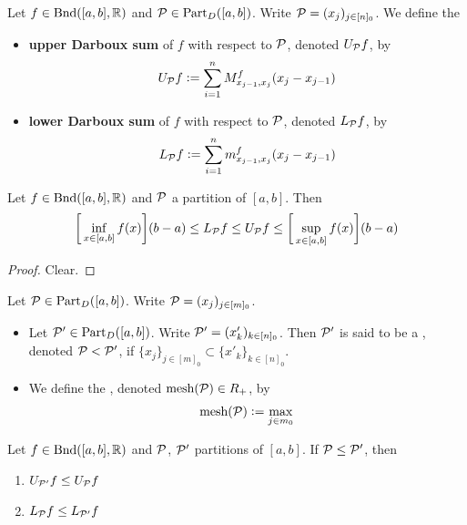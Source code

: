\documentclass{book}
\begin{document}
	\begin{defn}  
		Let $f \in \text{Bnd}([a,b], \mathbb{R})$ and $\mathcal{P} \in \text{Part}_D([a,b])$. Write $\mathcal{P} = (x_j)_{j \in [n]_0}$. 
		We define the 
		\begin{itemize}
			\item \textbf{upper Darboux sum} of $f$ with respect to $\mathcal{P}$, denoted $U_{\mathcal{P}} f$, by 
			$$U_{\mathcal{P}} f \vcentcolon= \sum\limits_{i=1}^n M^f_{x_{j-1}, x_j} (x_j - x_{j-1})$$ 
			\item \textbf{lower Darboux sum} of $f$ with respect to $\mathcal{P}$, denoted $L_{\mathcal{P}} f$, by
			$$L_{\mathcal{P}} f \vcentcolon= \sum\limits_{i=1}^n m^f_{x_{j-1}, x_j} (x_j - x_{j-1})$$ 
		\end{itemize}
	\end{defn}
	
	\begin{ex}  
		Let $f \in \text{Bnd}([a,b], \mathbb{R})$ and $\mathcal{P}$ a partition of $[a,b]$. Then 
		$$\bigg[\inf_{x \in [a,b]} f(x) \bigg] (b-a) \leq L_{\mathcal{P}} f \leq U_{\mathcal{P}} f \leq \bigg[ \sup_{x \in [a,b]} f(x)  \bigg] (b-a)$$
	\end{ex}
	
	\begin{proof}
		Clear.
	\end{proof}
	
	\begin{defn}
		Let $\mathcal{P} \in \text{Part}_D([a,b])$. Write $\mathcal{P} = (x_j)_{j \in [m]_0}$.
		\begin{itemize}
			\item Let $\mathcal{P}' \in \text{Part}_D([a,b])$. Write $\mathcal{P}' = (x'_k)_{k \in [n]_0}$. Then $\mathcal{P}'$ is said to be a , denoted $\mathcal{P} < \mathcal{P}'$, if $\{x_j\}_{j \in [m]_0} \subset \{x'_k\}_{k \in [n]_0}$.
			\item We define the , denoted $\text{mesh}(\mathcal{P}) \in R_+$, by 
			$$\text{mesh}(\mathcal{P}) \vcentcolon= \max\limits_{j \in m_0}$$
		\end{itemize}
		
	\end{defn}
	
	\begin{ex}  
		Let $f \in \text{Bnd}([a,b], \mathbb{R})$ and $\mathcal{P}$, $\mathcal{P}'$ partitions of $[a,b]$. If $\mathcal{P} \leq \mathcal{P}'$, then 
		\begin{enumerate}
			\item $U_{\mathcal{P}'} f \leq U_{\mathcal{P}} f$
			\item $L_{\mathcal{P}} f \leq L_{\mathcal{P}'} f$
		\end{enumerate}
	\end{ex}
	
\end{document}
